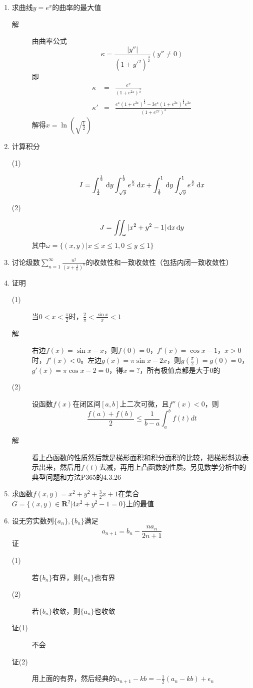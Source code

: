 \begin{enumerate}
\item 求曲线$y=e^x$的曲率的最大值
\begin{description}
\item[解] 由曲率公式
\[
\kappa = \frac{|y''|}{(1+y'^2)^\frac{3}{2}} (y''\neq 0)
\]
即
\begin{eqnarray*}
\kappa &=& \frac{e^x}{(1+e^{2x})^\frac{3}{2}}\\
\kappa' &=& \frac{e^x(1+e^{2x})^\frac{3}{2}-3e^x(1+e^{2x})^\frac{1}{2}e^{2x}}{(1+e^{2x})^3}
\end{eqnarray*}
解得$x=\ln(\sqrt{\frac{1}{2}})$
\end{description}

\item 计算积分
\begin{description}
\item[(1)]
\[
I = \int_{\frac{1}{4}}^{\frac{1}{2}}\,\mathrm{d} y \int_{\sqrt{y}}^{\frac{1}{2}}e^{\frac{y}{x}} \,\mathrm{d} x + \int_{\frac{1}{2}}^1 \,\mathrm{d} y \int_{\sqrt{y}}^1 e^{\frac{y}{x}} \,\mathrm{d} x
\]
\item[(2)]
\[
J = \iint_{\omega} |x^2+y^2-1|\,\mathrm{d} x \,\mathrm{d} y
\]
其中$\omega=\{(x,y)|x\leq x\leq 1,0\leq y\leq 1\}$
\end{description}

\item 讨论级数$\sum_{n=1}^{\infty}\frac{n^2}{(x+\frac{1}{n})^n}$的收敛性和一致收敛性（包括内闭一致收敛性）

\item 证明
\begin{description}
\item[(1)] 当$0<x<\frac{\pi}{2}$时，$\frac{2}{\pi}<\frac{\sin x}{x}<1$
\item[解] 右边$f(x)=\sin x-x$，则$f(0)=0$，$f'(x)=\cos x -1$，$x>0$时，$f'(x)<0$。左边$g(x)=\pi\sin x-2x$，则$g(\frac{\pi}{2})=g(0)=0$，$g'(x)=\pi\cos x-2=0$，得$x=?$，所有极值点都是大于0的
\item[(2)] 设函数$f(x)$在闭区间$[a,b]$上二次可微，且$f''(x)<0$，则
\[
\frac{f(a)+f(b)}{2} \leq \frac{1}{b-a}\int_a^b f(t)dt
\]
\item[解] 看上凸函数的性质然后就是梯形面积和积分面积的比较，把梯形斜边表示出来，然后用$f(t)$去减，再用上凸函数的性质。另见数学分析中的典型问题和方法P365的4.3.26
\end{description}

\item 求函数$f(x,y)=x^2+y^2+\frac{3}{2}x +1$在集合$G=\{(x,y)\in \mathbf{R}^2|4x^2+y^2-1=0\}$上的最值

\item 设无穷实数列$\{a_n\},\{b_n\}$满足
\[
a_{n+1} = b_n - \frac{na_n}{2n+1}
\]
证
\begin{description}
\item[(1)] 若$\{b_n\}$有界，则$\{a_n\}$也有界
\item[(2)] 若$\{b_n\}$收敛，则$\{a_n\}$也收敛
\item[证(1)] 不会
\item[证(2)] 用上面的有界，然后经典的$a_{n+1}-kb=-\frac{1}{2}(a_n-kb)+\epsilon_n$


\end{description}
\end{enumerate}
